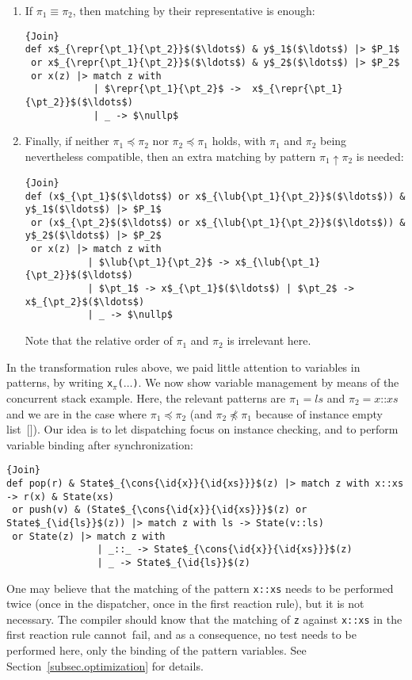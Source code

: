 \documentclass{LMCS}
\let \lst \lstinline
\newcommand{\pt}{\pi}
\newcommand{\id}[1]{\textit{#1}}
\newcommand{\lubop}{\mathop{\uparrow}}
\newcommand{\lub}[2]{#1 \lubop #2}
\newcommand{\cons}[2]{#1\mathord{\texttt{::}}#2}
\newcommand{\nil}{\texttt{[]}}
\newcommand{\repr}[2]{#1 \mathop{\updownarrow} #2}
\renewcommand{\_}{\mathord{\rule[-.25ex]{1ex}{.15ex}}}
\newcommand{\nullp}{0}
\begin{document}
\begin{enumerate}[$\bullet$]
\item If $\pt_1 \equiv \pt_2$, then matching by their representative
is enough:
\begin{lstlisting}{Join}
def x$_{\repr{\pt_1}{\pt_2}}$($\ldots$) & y$_1$($\ldots$) |> $P_1$
 or x$_{\repr{\pt_1}{\pt_2}}$($\ldots$) & y$_2$($\ldots$) |> $P_2$
 or x(z) |> match z with
            | $\repr{\pt_1}{\pt_2}$ ->  x$_{\repr{\pt_1}{\pt_2}}$($\ldots$)
            | _ -> $\nullp$
\end{lstlisting}

\item Finally, if neither $\pt_1 \preceq \pt_2$ nor $\pt_2 \preceq
  \pt_1$ holds, with $\pt_1$ and $\pt_2$ being nevertheless compatible,
  then an extra matching by pattern $\lub{\pt_1}{\pt_2}$ is needed:
\begin{lstlisting}{Join}
def (x$_{\pt_1}$($\ldots$) or x$_{\lub{\pt_1}{\pt_2}}$($\ldots$)) & y$_1$($\ldots$) |> $P_1$
 or (x$_{\pt_2}$($\ldots$) or x$_{\lub{\pt_1}{\pt_2}}$($\ldots$)) & y$_2$($\ldots$) |> $P_2$
 or x(z) |> match z with
           | $\lub{\pt_1}{\pt_2}$ -> x$_{\lub{\pt_1}{\pt_2}}$($\ldots$)
           | $\pt_1$ -> x$_{\pt_1}$($\ldots$) | $\pt_2$ -> x$_{\pt_2}$($\ldots$)
           | _ -> $\nullp$
\end{lstlisting}
Note that the relative order of $\pt_1$ and $\pt_2$ is irrelevant here.
\end{enumerate}

In the transformation rules above, we paid little attention to
variables in patterns, by writing
\lst"x"$_{\pt}$\lst"("$\ldots$\lst")".  We now show variable
management by means of the concurrent stack example.  Here, the
relevant patterns are $\pt_1 = \id{ls}$ and $\pt_2 =
\cons{\id{x}}{\id{xs}}$ and we are in the case where $\pt_1 \preceq
\pt_2$ (and $\pt_2 \not\preceq \pt_1$ because of instance empty
list~$\nil$).  Our idea is to let dispatching focus on instance
checking, and to perform variable binding after synchronization:
\begin{lstlisting}{Join}
def pop(r) & State$_{\cons{\id{x}}{\id{xs}}}$(z) |> match z with x::xs -> r(x) & State(xs)
 or push(v) & (State$_{\cons{\id{x}}{\id{xs}}}$(z) or State$_{\id{ls}}$(z)) |> match z with ls -> State(v::ls)
 or State(z) |> match z with
                | _::_ -> State$_{\cons{\id{x}}{\id{xs}}}$(z)
                | _ -> State$_{\id{ls}}$(z)
\end{lstlisting}
One may believe that the matching of the pattern \lst"x::xs" needs to
be performed twice (once in the dispatcher, once in the first reaction
rule), but it is not necessary.  The compiler should know that the
matching of \lst$z$ against \lst$x::xs$ in the first reaction rule
cannot~fail, and as a consequence, no test needs to be performed here,
only the binding of the pattern variables.
See Section~\ref{subsec.optimization} for details.
\end{document}
